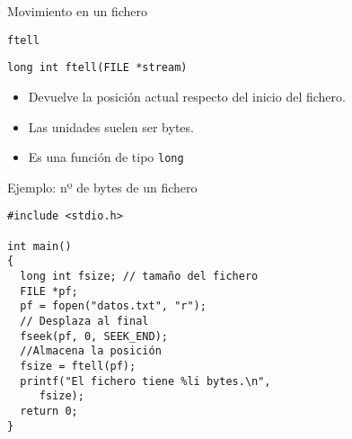 \documentclass[usenames,svgnames,dvipsnames, aspectratio=169]{beamer}
\begin{document}
\begin{frame}[label={sec:org13446f1},fragile]{Movimiento en un fichero}
 \begin{block}{\texttt{ftell}}
\lstset{language=C,label= ,caption= ,captionpos=b,numbers=none}
\begin{lstlisting}
long int ftell(FILE *stream)
\end{lstlisting}

\begin{itemize}
\item Devuelve la posición actual respecto del inicio del fichero.
\item Las unidades suelen ser \alert{bytes}.
\item Es una función de tipo \texttt{long}
\end{itemize}
\end{block}
\end{frame}

\begin{frame}[label={sec:orgeae98c6},fragile]{Ejemplo: nº de bytes de un fichero}
 \lstset{language=C,label= ,caption= ,captionpos=b,numbers=none}
\begin{lstlisting}
#include <stdio.h>

int main()
{
  long int fsize; // tamaño del fichero
  FILE *pf;
  pf = fopen("datos.txt", "r");
  // Desplaza al final
  fseek(pf, 0, SEEK_END);
  //Almacena la posición
  fsize = ftell(pf);
  printf("El fichero tiene %li bytes.\n",
	 fsize);
  return 0;
}
\end{lstlisting}
\end{frame}
\end{document}

